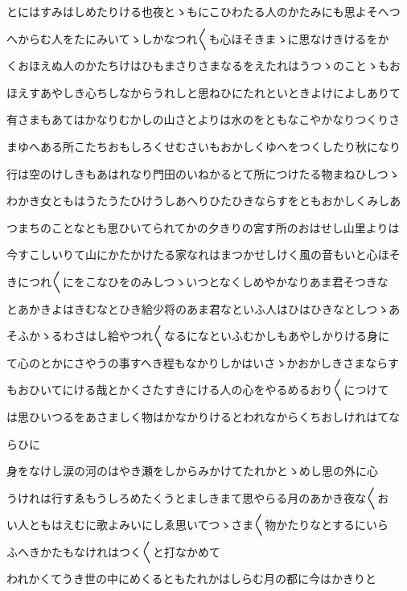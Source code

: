 \documentclass[a4paper,11pt,landscape]{ltjtarticle}
\begin{document}
とにはすみはしめたりける也夜とゝもにこひわたる人のかたみにも思よそへつ
\par\medskip
へからむ人をたにみいてゝしかなつれ〱も心ほそきまゝに思なけきけるをか
\par\medskip
くおほえぬ人のかたちけはひもまさりさまなるをえたれはうつゝのことゝもお
\par\medskip
ほえすあやしき心ちしなからうれしと思ねひにたれといときよけによしありて
\par\medskip
有さまもあてはかなりむかしの山さとよりは水のをともなこやかなりつくりさ
\par\medskip
まゆへある所こたちおもしろくせむさいもおかしくゆへをつくしたり秋になり
\par\medskip
行は空のけしきもあはれなり門田のいねかるとて所につけたる物まねひしつゝ
\par\medskip
わかき女ともはうたうたひけうしあへりひたひきならすをともおかしくみしあ
\par\medskip
つまちのことなとも思ひいてられてかの夕きりの宮す所のおはせし山里よりは
\par\medskip
今すこしいりて山にかたかけたる家なれはまつかせしけく風の音もいと心ほそ
\par\medskip
きにつれ〱にをこなひをのみしつゝいつとなくしめやかなりあま君そつきな
\par\medskip
とあかきよはきむなとひき給少将のあま君なといふ人はひはひきなとしつゝあ
\par\medskip
そふかゝるわさはし給やつれ〱なるになといふむかしもあやしかりける身に
\par\medskip
て心のとかにさやうの事すへき程もなかりしかはいさゝかおかしきさまならす
\par\medskip
もおひいてにける哉とかくさたすきにける人の心をやるめるおり〱につけて
\par\medskip
は思ひいつるをあさましく物はかなかりけるとわれなからくちおしけれはてな
\par\medskip
らひに
\par\medskip
身をなけし涙の河のはやき瀬をしからみかけてたれかとゝめし思の外に心
\par\medskip
うけれは行すゑもうしろめたくうとましきまて思やらる月のあかき夜な〱お
\par\medskip
い人ともはえむに歌よみいにしゑ思いてつゝさま〱物かたりなとするにいら
\par\medskip
ふへきかたもなけれはつく〱と打なかめて
\par\medskip
われかくてうき世の中にめくるともたれかはしらむ月の都に今はかきりと
\par\medskip
\end{document}
